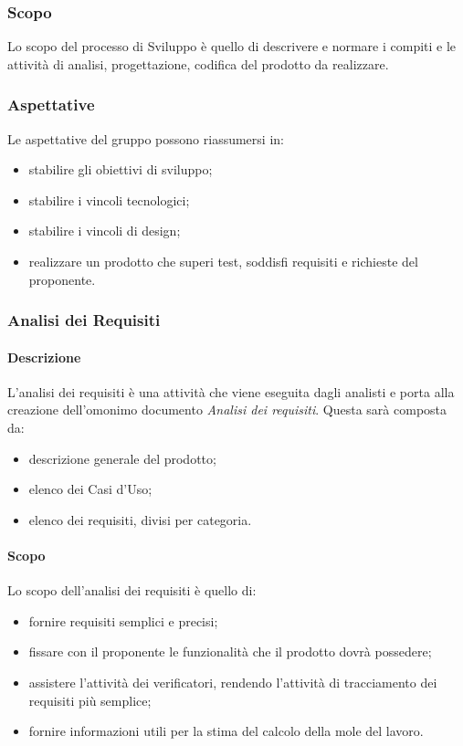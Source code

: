   \subsubsection{Scopo}
	Lo scopo del processo di Sviluppo è quello di descrivere e normare i compiti e le attività di analisi, progettazione, codifica del prodotto da realizzare.
		
  \subsubsection{Aspettative}
  Le aspettative del gruppo possono riassumersi in:
	\begin{itemize}
		\item stabilire gli obiettivi di sviluppo;
		\item stabilire i vincoli tecnologici;
		\item stabilire i vincoli di design;
		\item realizzare un prodotto che superi test, soddisfi requisiti e richieste del proponente.
	\end{itemize}
	
	\subsubsection{Analisi dei Requisiti}
    \paragraph{Descrizione} \hfill \break
    L'analisi dei requisiti è una attività che viene eseguita dagli analisti e porta alla creazione 
    dell'omonimo documento \textit{Analisi dei requisiti}.
    Questa sarà composta da:
    \begin{itemize}
      \item descrizione generale del prodotto;
      \item elenco dei Casi d'Uso;
      \item elenco dei requisiti, divisi per categoria.
    \end{itemize}
    
    \paragraph{Scopo} \hfill \break
    Lo scopo dell'analisi dei requisiti è quello di:
    \begin{itemize}
      \item fornire requisiti semplici e precisi;
      \item fissare con il proponente le funzionalità che il prodotto dovrà possedere;
      \item assistere l'attività dei verificatori, rendendo l'attività di tracciamento dei requisiti più semplice;
      \item fornire informazioni utili per la stima del calcolo della mole del lavoro.
    \end{itemize}
    
